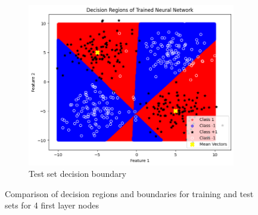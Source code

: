 \documentclass[a4paper,12pt]{article}
\begin{document}
\begin{figure}[H]
    \begin{subfigure}{0.45\textwidth}
        \centering
        \includegraphics[width=\textwidth]{3.2_4_Test.png}
        \caption{Test set decision boundary}
    \end{subfigure}

    \caption{Comparison of decision regions and boundaries for training and test sets for 4 first layer nodes} 
\end{figure}
\end{document}
